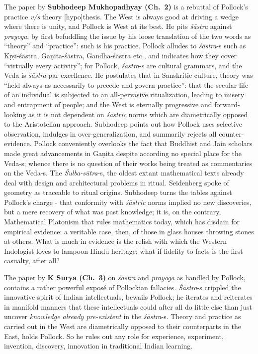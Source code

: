 The paper by {\bf Subhodeep Mukhopadhyay (Ch.~2)} is a rebuttal of Pollock’s practice {\sl v/s} theory [hypo]thesis. The West is always good at driving a wedge where there is unity, and Pollock is West at its best. He pits {\sl śāstra} against  {\sl prayoga}, by first befuddling the issue by his loose translation of the two words as “theory” and “practice”: such is his practice. Pollock alludes to {\sl śāstra}-s such as Kṛṣī-śāstra, Gaṇita-śāstra, Gandha-śāstra etc., and indicates how they cover “virtually every activity”; for Pollock, {\sl śastra}-s are cultural grammars, and the Veda is {\sl śāstra} par excellence. He postulates that in Sanskritic culture, theory was “held always as necessarily to precede and govern practice'': that the secular life of an individual is subjected to an all-pervasive ritualization, leading to misery and entrapment of people; and the West is eternally progressive and forward-looking as it is not dependent on {\sl śāstric} norms which are diametrically opposed to the Aristotelian approach. Subhodeep points out how Pollock uses selective observation, indulges in over-generalization, and summarily rejects all counter-evidence. Pollock conveniently overlooks the fact that Buddhist and Jain scholars made great advancements in Gaṇita despite according no special place for the Veda-s; whence there is no question of their works being treated as commentaries on the \hbox{Veda-s}. The {\sl Śulba-sūtra}-s, the oldest extant mathematical texts already deal with design and architectural problems in ritual. Seidenberg spoke of geometry as traceable to ritual origins. Subhodeep turns the tables against Pollock’s charge - that conformity with {\sl śāstric} norms implied no new discoveries, but a mere recovery of what was past knowledge; it is, on the contrary, Mathematical Platonism that rules mathematics today, which has disdain for empirical evidence: a veritable case, then, of those in glass houses throwing stones at others. What is much in evidence is the relish with which the Western Indologist loves to lampoon Hindu heritage: what if fidelity to facts is the first casualty, after all?
\vskip 4pt

The paper by {\bf K Surya (Ch.~3)} on {\sl śāstra} and {\sl prayoga} as handled by Pollock, contains a rather powerful exposé of Pollockian fallacies. {\sl Śāstra}-s crippled the innovative spirit of Indian intellectuals, bewails Pollock; he iterates and reiterates in manifold manners that these intellectuals could after all do little else than just uncover {\sl knowledge already pre-existent} in the {\sl śāstra}-s. Theory and practice as carried out in the West are diametrically opposed to their counterparts in the East, holds Pollock. So he rules out any role for experience, experiment, invention, discovery, innovation in traditional Indian learning.

